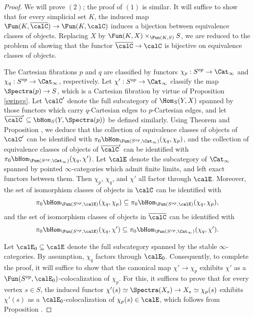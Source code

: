 \begin{proof}
We will prove $(2)$; the proof of $(1)$ is similar.
It will suffice to show that for every simplicial set $K$, the induced map
$\Fun(K, \overline{\calC}) \rightarrow \Fun(K, \calC)$ induces a bijection between
equivalence classes of objects. Replacing $X$ by $\Fun(K,X) \times_{ \Fun(K,S) } S$, we
are reduced to the problem of showing that the functor $\overline{\calC} \rightarrow \calC$ is
bijective on equivalence classes of objects. 

The Cartesian fibrations $p$ and $q$ are classified by functors
$\chi_{p}: S^{op} \rightarrow \Cat_{\infty}$ and $\chi_{q}: S^{op} \rightarrow \Cat_{\infty}$,
respectively. Let $\chi': S^{op} \rightarrow \Cat_{\infty}$ classify the map $\Spectra(p) \rightarrow S$, 
which is a Cartesian fibration by virtue of Proposition \ref{swingg}. 
Let $\calC'$ denote the full subcategory of $\Hom_{S}(Y,X)$ spanned by those functors
which carry $q$-Cartesian edges to $p$-Cartesian edges, and let $\overline{\calC}'
\subseteq \bHom_{S}(Y, \Spectra(p) )$ be defined similarly. Using
Theorem  and Proposition , we deduce that the collection of equivalence classes
of objects of $\calC'$ can be identified with $\pi_0 \bHom_{ \Fun( S^{op}, \Cat_{\infty})}( \chi_{q}, \chi_{p})$, and the collection of equivalence classes of objects of $\overline{\calC}'$ can be identified
with $\pi_0 \bHom_{ \Fun( S^{op}, \Cat_{\infty})}( \chi_{q}, \chi')$. Let
$\calE$ denote the subcategory of $\Cat_{\infty}$ spanned by pointed $\infty$-categories
which admit finite limits, and left exact functors between them. Then
$\chi_p$, $\chi_q$, and $\chi'$ all factor through $\calE$. Moreover, the set of
isomorphism classes of objects in $\calC$ can be identified with
$$\pi_0 \bHom_{ \Fun( S^{op}, \calE)}( \chi_{q}, \chi_{p})
\subseteq \pi_0 \bHom_{ \Fun( S^{op}, \calE)}( \chi_q, \chi_{p}),$$
and the set of isomorphism classes of objects in $\overline{\calC}$ can be identified with
$$\pi_0 \bHom_{ \Fun( S^{op}, \calE)}( \chi_{q}, \chi') \subseteq
\pi_0 \bHom_{ \Fun( S^{op}, \Cat_{\infty})}( \chi_q, \chi' ).$$

Let $\calE_0 \subseteq \calE$ denote the full subcategory spanned by the
stable $\infty$-categories. By assumption, $\chi_q$ factors through $\calE_0$.
Consequently, to complete the proof, it will suffice to show that the canonical map
$\chi' \rightarrow \chi_p$ exhibits $\chi'$ as a $\Fun( S^{op}, \calE_0)$-colocalization
of $\chi_p$. For this, it suffices to prove that for every vertex $s \in S$, the induced functor
$\chi'(s) \simeq \Spectra(X_s) \rightarrow X_s \simeq \chi_p(s)$ exhibits
$\chi'(s)$ as a $\calE_0$-colocalization of $\chi_p(s) \in \calE$, which follows
from Proposition .
\end{proof}

